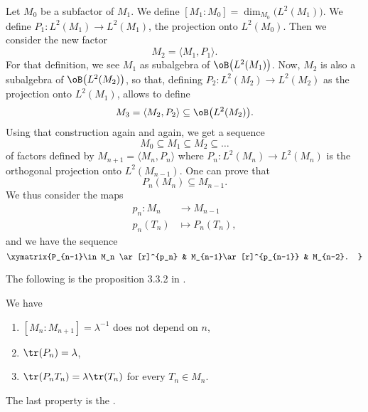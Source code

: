 Let $M_0$ be a subfactor of $M_1$. We define $[M_1:M_0]=\dim_{M_0}\big( L^2(M_1) \big)$. We define $P_1\colon  L^2(M_1)\to L^2(M_1)$, the projection onto $L^2(M_0)$. Then we consider the new factor
\begin{equation}
	M_2=\langle M_1, P_1\rangle.
\end{equation}
For that definition, we see $M_1$ as subalgebra of $\oB\big( L^2(M_1) \big)$. Now, $M_2$ is also a subalgebra of $\oB\big( L^2(M_2) \big)$, so that, defining $P_2\colon L^2(M_2)\to L^2(M_2)$ as the projection onto $L^2(M_1)$, allows to define 
\begin{equation}
	M_3=\langle M_2, P_2\rangle \subseteq\oB\big( L^2(M_2) \big).
\end{equation}
Using that construction again and again, we get a sequence
\begin{equation}
	M_0\subseteq M_1\subseteq M_2\subseteq\ldots
\end{equation}
of factors defined by $M_{n+1}=\langle M_n, P_n\rangle $ where $P_n\colon L^2(M_n)\to L^2(M_n)$ is the orthogonal projection onto $L^2(M_{n-1})$. One can prove that
\begin{equation}
	P_n(M_n)\subseteq M_{n-1}.
\end{equation}
We thus consider the maps
\begin{equation}
\begin{aligned}
 p_n\colon M_n&\to M_{n-1} \\ 
   p_n(T_n)&\mapsto P_n(T_n),
\end{aligned}
\end{equation}
and we have the sequence
\begin{equation}
\xymatrix{%
   P_{n-1}\in M_n \ar[r]^{p_n}	&	M_{n-1}\ar[r]^{p_{n-1}}	& M_{n-2}.
}	
\end{equation}

The following is the proposition 3.3.2 in \cite{JonesSunder}.

\begin{proposition}		\label{ProppropsindexMarkov}
We have
\begin{enumerate}
\item $[M_n:M_{n+1}]=\lambda^{-1}$ does not depend on $n$,
\item $\tr(P_n)=\lambda$,
\item $\tr(P_nT_n)=\lambda\tr(T_n)$ for every $T_n\in M_n$.
\end{enumerate}
\end{proposition}

The last property is the .


